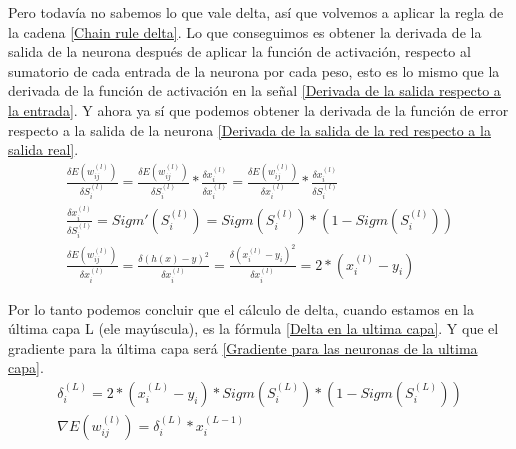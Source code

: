 Pero todavía no sabemos lo que vale delta, así que volvemos a aplicar la regla de la cadena \ref{Chain rule delta}. Lo que conseguimos es obtener la derivada de la salida de la neurona después de aplicar la función de activación, respecto al sumatorio de cada entrada de la neurona por cada peso, esto es lo mismo que la derivada de la función de activación en la señal \ref{Derivada de la salida respecto a la entrada}. Y ahora ya sí que podemos obtener la derivada de la función de error respecto a la salida de la neurona \ref{Derivada de la salida de la red respecto a la salida real}.
\begin{subequations}
	\begin{eqnarray}
		\frac{\delta E(w_{ij}^{(l)})}{\delta S_{i}^{(l)}} = \frac{\delta E(w_{ij}^{(l)})}{\delta S_{i}^{(l)}} * \frac{\delta x_{i}^{(l)}}{\delta x_{i}^{(l)}} = \frac{\delta E(w_{ij}^{(l)})}{\delta x_{i}^{(l)}} * \frac{\delta x_{i}^{(l)}}{\delta S_{i}^{(l)}} \label{Chain rule delta} \\
		\frac{\delta x_{i}^{(l)}}{\delta S_{i}^{(l)}} = Sigm'(S_{i}^{(l)}) = Sigm(S_{i}^{(l)}) * (1 - Sigm(S_{i}^{(l)})) \label{Derivada de la salida respecto a la entrada} \\
		\frac{\delta E(w_{ij}^{(l)})}{\delta x_{i}^{(l)}} = \frac{\delta (h(x) - y)^2}{\delta x_{i}^{(l)}} = \frac{\delta (x_{i}^{(l)} - y_{i})^2}{\delta x_{i}^{(l)}} = 2 * (x_{i}^{(l)} - y_{i}) \label{Derivada de la salida de la red respecto a la salida real}
	\end{eqnarray}
\end{subequations}

Por lo tanto podemos concluir que el cálculo de delta, cuando estamos en la última capa L (ele mayúscula), es la fórmula \ref{Delta en la ultima capa}. Y que el gradiente para la última capa será \ref{Gradiente para las neuronas de la ultima capa}.
\begin{subequations}
	\begin{eqnarray}
		\delta_{i}^{(L)} = 2 * (x_{i}^{(L)} - y_{i}) * Sigm(S_{i}^{(L)}) * (1 - Sigm(S_{i}^{(L)})) \label{Delta en la ultima capa} \\
		\nabla E(w_{ij}^{(l)}) = \delta_{i}^{(L)}  * x_{i}^{(L-1)} \label{Gradiente para las neuronas de la ultima capa}
	\end{eqnarray}
\end{subequations}

